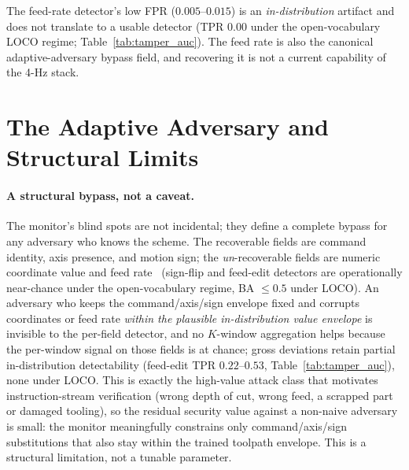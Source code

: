 \documentclass[sensors,article,submit,moreauthors,pdftex]{Definitions/mdpi}
\begin{document}
The feed-rate detector's low FPR ($0.005$--$0.015$) is an \emph{in-distribution} artifact and does not translate to a usable detector (TPR $0.00$ under the open-vocabulary LOCO regime; Table~\ref{tab:tamper_auc}). The feed rate is also the canonical adaptive-adversary bypass field, and recovering it is not a current capability of the 4-Hz stack.

\section{The Adaptive Adversary and Structural Limits}
\label{sec:adaptive}

\paragraph{A structural bypass, not a caveat.} The monitor's blind spots are not incidental; they define a complete bypass for any adversary who knows the scheme. The recoverable fields are command identity, axis presence, and motion sign; the \emph{un}-recoverable fields are numeric coordinate value and feed rate~\cite{decoder_paper} (sign-flip and feed-edit detectors are operationally near-chance under the open-vocabulary regime, BA $\le\!0.5$ under LOCO). An adversary who keeps the command/axis/sign envelope fixed and corrupts coordinates or feed rate \emph{within the plausible in-distribution value envelope} is invisible to the per-field detector, and no $K$-window aggregation helps because the per-window signal on those fields is at chance; gross deviations retain partial in-distribution detectability (feed-edit TPR $0.22$--$0.53$, Table~\ref{tab:tamper_auc}), none under LOCO. This is exactly the high-value attack class that motivates instruction-stream verification (wrong depth of cut, wrong feed, a scrapped part or damaged tooling), so the residual security value against a non-naive adversary is small: the monitor meaningfully constrains only command/axis/sign substitutions that also stay within the trained toolpath envelope. This is a structural limitation, not a tunable parameter.
\end{document}
